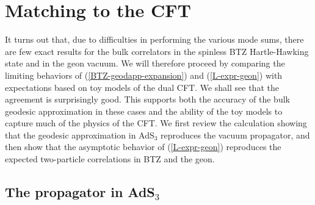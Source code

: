 \documentclass[a4paper,12pt]{article}
\begin{document}
\section{Matching to the CFT}

It turns out that, due to difficulties in performing the various mode
sums, there are few exact results for the bulk correlators in the
spinless BTZ Hartle-Hawking state and in the geon vacuum.  We will
therefore proceed by comparing the limiting behaviors of
(\ref{BTZ-geodapp-expansion}) and (\ref{L-expr-geon}) with
expectations based on toy models of the dual CFT.  We shall see that
the agreement is surprisingly good.  This supports both the accuracy
of the bulk geodesic approximation in these cases and the ability of
the toy models to capture much of the physics of the CFT.  We first
review the calculation showing that the geodesic approximation in
AdS$_3$ reproduces the vacuum propagator, and then show that the
asymptotic behavior of (\ref{L-expr-geon}) reproduces the expected
two-particle correlations in BTZ and the geon.

\subsection{The propagator in AdS$_3$}
\label{limits}
\end{document}

